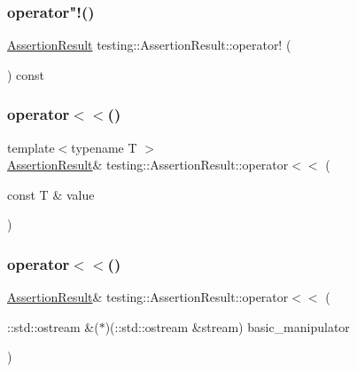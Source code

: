 \mbox{\label{classtesting_1_1_assertion_result_a5b0784686a756660ac8dfe528d89386b}} 
\subsubsection{\texorpdfstring{operator"!()}{operator!()}}
{\footnotesize\ttfamily \mbox{\hyperlink{classtesting_1_1_assertion_result}{Assertion\+Result}} testing\+::\+Assertion\+Result\+::operator! (\begin{DoxyParamCaption}{ }\end{DoxyParamCaption}) const}

\mbox{\label{classtesting_1_1_assertion_result_a3230efa81aafe7c61f5fb878cfa39e91}} 
\subsubsection{\texorpdfstring{operator$<$$<$()}{operator<<()}\hspace{0.1cm}{\footnotesize\ttfamily [1/2]}}
{\footnotesize\ttfamily template$<$typename T $>$ \\
\mbox{\hyperlink{classtesting_1_1_assertion_result}{Assertion\+Result}}\& testing\+::\+Assertion\+Result\+::operator$<$$<$ (\begin{DoxyParamCaption}\item[{const T \&}]{value }\end{DoxyParamCaption})\hspace{0.3cm}{\ttfamily [inline]}}

\mbox{\label{classtesting_1_1_assertion_result_a43ae8a260843ce2ff3dc9af262672b8b}} 
\subsubsection{\texorpdfstring{operator$<$$<$()}{operator<<()}\hspace{0.1cm}{\footnotesize\ttfamily [2/2]}}
{\footnotesize\ttfamily \mbox{\hyperlink{classtesting_1_1_assertion_result}{Assertion\+Result}}\& testing\+::\+Assertion\+Result\+::operator$<$$<$ (\begin{DoxyParamCaption}\item[{\+::std\+::ostream \&($\ast$)(\+::std\+::ostream \&stream)}]{basic\+\_\+manipulator }\end{DoxyParamCaption})\hspace{0.3cm}{\ttfamily [inline]}}

